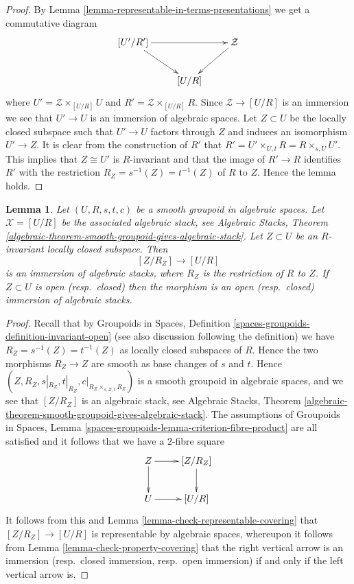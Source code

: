 \documentclass{stacks-project}
\theoremstyle{plain}
\newtheorem{lemma}[subsection]{Lemma}
\theoremstyle{definition}
\theoremstyle{remark}
\numberwithin{equation}{subsection}
\begin{document}
\begin{proof}
By
Lemma \ref{lemma-representable-in-terms-presentations}
we get a commutative diagram
$$
\xymatrix{
[U'/R'] \ar[dr] \ar[rr] & & \mathcal{Z} \ar[ld] \\
& [U/R]
}
$$
where $U' = \mathcal{Z} \times_{[U/R]} U$ and
$R' = \mathcal{Z} \times_{[U/R]} R$.
Since $\mathcal{Z} \to [U/R]$ is an immersion we see that
$U' \to U$ is an immersion of algebraic spaces. Let $Z \subset U$
be the locally closed subspace such that $U' \to U$ factors through
$Z$ and induces an isomorphism $U' \to Z$.
It is clear from the construction of $R'$ that
$R' = U' \times_{U, t} R = R \times_{s, U} U'$.
This implies that $Z \cong U'$ is $R$-invariant and that the image of
$R' \to R$ identifies $R'$ with the restriction
$R_Z = s^{-1}(Z) = t^{-1}(Z)$ of $R$ to $Z$. Hence the lemma holds.
\end{proof}

\begin{lemma}
\label{lemma-immersion-presentation}
Let $(U, R, s, t, c)$ be a smooth groupoid in algebraic spaces.
Let $\mathcal{X} = [U/R]$ be the associated algebraic stack, see
Algebraic Stacks,
Theorem \ref{algebraic-theorem-smooth-groupoid-gives-algebraic-stack}.
Let $Z \subset U$ be an $R$-invariant locally closed subspace. Then
$$
[Z/R_Z] \longrightarrow [U/R]
$$
is an immersion of algebraic stacks, where $R_Z$ is the restriction
of $R$ to $Z$. If $Z \subset U$ is open (resp.\ closed) then the morphism
is an open (resp.\ closed) immersion of algebraic stacks.
\end{lemma}

\begin{proof}
Recall that by
Groupoids in Spaces,
Definition \ref{spaces-groupoids-definition-invariant-open}
(see also discussion following the definition)
we have $R_Z = s^{-1}(Z) = t^{-1}(Z)$ as locally closed subspaces
of $R$. Hence the two morphisms $R_Z \to Z$ are smooth as base changes
of $s$ and $t$. Hence
$(Z, R_Z, s|_{R_Z}, t|_{R_Z}, c|_{R_Z \times_{s, Z, t} R_Z})$ is
a smooth groupoid in algebraic spaces, and we see that
$[Z/R_Z]$ is an algebraic stack, see
Algebraic Stacks,
Theorem \ref{algebraic-theorem-smooth-groupoid-gives-algebraic-stack}.
The assumptions of
Groupoids in Spaces,
Lemma \ref{spaces-groupoids-lemma-criterion-fibre-product}
are all satisfied and it follows that we have a $2$-fibre square
$$
\xymatrix{
Z \ar[d] \ar[r] & [Z/R_Z] \ar[d] \\
U \ar[r] & [U/R]
}
$$
It follows from this and
Lemma \ref{lemma-check-representable-covering}
that $[Z/R_Z] \to [U/R]$ is representable by algebraic spaces,
whereupon it follows from
Lemma \ref{lemma-check-property-covering}
that the right vertical arrow is an immersion (resp.\ closed immersion,
resp.\ open immersion) if and only if the left vertical arrow is.
\end{proof}
\end{document}
